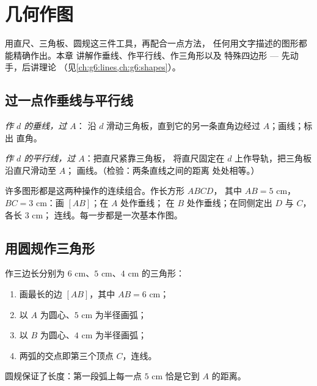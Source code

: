 \chapter{几何作图}\label{ch:g5:geometry}

用直尺、三角板、圆规这三件工具，再配合一点方法，
任何用文字描述的图形都能精确作出。本章
讲解作垂线、作平行线、作三角形以及
特殊四边形 --- 先动手，后讲理论
（见\cref{ch:g6:lines,ch:g6:shapes}）。

\section{过一点作垂线与平行线}

\begin{method}[两种基本作图]\label{met:g5:geometry:basic}
\emph{作 $d$ 的垂线，过 $A$}：
沿 $d$ 滑动三角板，直到它的另一条直角边经过 $A$；画线；标出
直角。

\emph{作 $d$ 的平行线，过 $A$}：把直尺紧靠三角板，
将直尺固定在 $d$ 上作导轨，把三角板沿直尺滑动至 $A$；
画线。（检验：两条直线之间的距离
处处相等。）
\end{method}

\begin{example}[连续作图]\label{ex:g5:geometry:chain}
许多图形都是这两种操作的连续组合。作长方形 $ABCD$，
其中 $AB = 5$ cm，$BC = 3$ cm：画 $[AB]$；在 $A$ 处作垂线；
在 $B$ 处作垂线；在同侧定出 $D$ 与 $C$，各长 $3$ cm；
连线。每一步都是一次基本作图。
\end{example}

\section{用圆规作三角形}

\begin{method}[已知三边作三角形]\label{met:g5:geometry:triangle}
作三边长分别为 $6$ cm、$5$ cm、$4$ cm 的三角形：
\begin{enumerate}
  \item 画最长的边 $[AB]$，其中 $AB = 6$ cm；
  \item 以 $A$ 为圆心、$5$ cm 为半径画弧；
  \item 以 $B$ 为圆心、$4$ cm 为半径画弧；
  \item 两弧的交点即第三个顶点 $C$，连线。
\end{enumerate}
圆规保证了长度：第一段弧上每一点
$5$ cm 恰是它到 $A$ 的距离。
\end{method}

